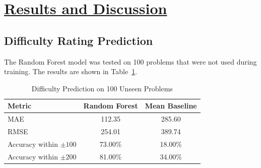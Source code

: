\documentclass[conference]{IEEEtran}
\begin{document}










\section{\underline{Results and Discussion}}

\subsection{Difficulty Rating Prediction}

The Random Forest model was tested on 100 problems that were not used during
training. The results are shown in Table~\ref{tab:difficulty_metrics}.

\begin{table}[htbp]
\caption{Difficulty Prediction on 100 Unseen Problems}
\centering
\begin{tabular}{lcc}
\toprule
Metric & Random Forest & Mean Baseline \\
\midrule
MAE & 112.35 & 285.60 \\
RMSE & 254.01 & 389.74 \\
Accuracy within $\pm100$ & 73.00\% & 18.00\% \\
Accuracy within $\pm200$ & 81.00\% & 34.00\% \\
\bottomrule
\end{tabular}
\label{tab:difficulty_metrics}
\end{table}
\end{document}

